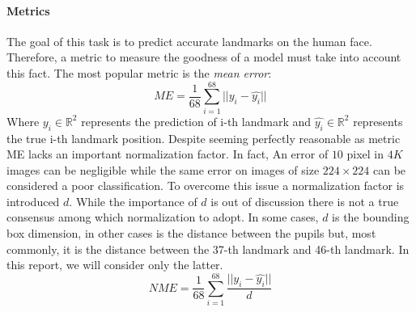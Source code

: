\paragraph{Metrics}
The goal of this task is to predict accurate landmarks on the human face. Therefore, a metric to measure the goodness of a model must take into account this fact. The most popular metric is the \textit{mean error}:
\[ME = \frac{1}{68}\sum_{i=1}^{68}||y_i-\hat{y_i}||\]
Where $y_i \in \mathbb{R}^2$ represents the prediction of i-th landmark and $\hat{y_i} \in \mathbb{R}^2$ represents the true i-th landmark position. Despite seeming perfectly reasonable as metric ME lacks an important normalization factor. In fact, An error of $10$ pixel in $4K$ images can be negligible while the same error on images of size $224\times 224$ can be considered a poor classification. To overcome this issue a normalization factor is introduced $d$. While the importance of $d$ is out of discussion there is not a true consensus among which normalization to adopt. In some cases, $d$ is the bounding box dimension, in other cases is the distance between the pupils but, most commonly, it is the distance between the 37-th landmark and 46-th landmark. In this report, we will consider only the latter.
\[NME = \frac{1}{68}\sum_{i=1}^{68}\frac{||y_i-\hat{y_i}||}{d}\]

